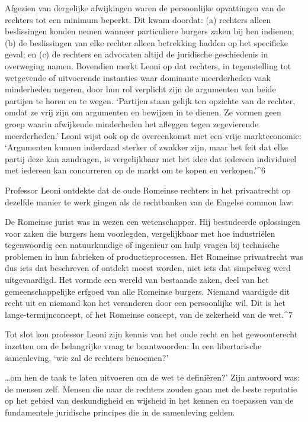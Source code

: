 \documentclass[
  a5paper,
  smalldemyvopaper,10pt,twoside,onecolumn,openright,extrafontsizes,hidelinks]{memoir}
\renewenvironment{quote}%
               {\list{}{\rightmargin=.6cm\leftmargin=.6cm}%
                \itshape \item[]}%
               {\endlist}
\begin{document}
Afgezien van dergelijke afwijkingen waren de persoonlijke opvattingen
van de rechters tot een minimum beperkt. Dit kwam doordat: (a) rechters
alleen beslissingen konden nemen wanneer particuliere burgers zaken bij
hen indienen; (b) de beslissingen van elke rechter alleen betrekking
hadden op het specifieke geval; en (c) de rechters en advocaten altijd
de juridische geschiedenis in overweging namen. Bovendien merkt Leoni op
dat rechters, in tegenstelling tot wetgevende of uitvoerende instanties
waar dominante meerderheden vaak minderheden negeren, door hun rol
verplicht zijn de argumenten van beide partijen te horen en te wegen.
`Partijen staan gelijk ten opzichte van de rechter, omdat ze vrij zijn
om argumenten en bewijzen in te dienen. Ze vormen geen groep waarin
afwijkende minderheden het afleggen tegen zegevierende meerderheden.'
Leoni wijst ook op de overeenkomst met een vrije markteconomie:
`Argumenten kunnen inderdaad sterker of zwakker zijn, maar het feit dat
elke partij deze kan aandragen, is vergelijkbaar met het idee dat
iedereen individueel met iedereen kan concurreren op de markt om te
kopen en verkopen.'\^{}6

Professor Leoni ontdekte dat de oude Romeinse rechters in het
privaatrecht op dezelfde manier te werk gingen als de rechtbanken van de
Engelse common law:

\begin{quote}
De Romeinse jurist was in wezen een wetenschapper. Hij bestudeerde
oplossingen voor zaken die burgers hem voorlegden, vergelijkbaar met hoe
industriëlen tegenwoordig een natuurkundige of ingenieur om hulp vragen
bij technische problemen in hun fabrieken of productieprocessen. Het
Romeinse privaatrecht was dus iets dat beschreven of ontdekt moest
worden, niet iets dat simpelweg werd uitgevaardigd. Het vormde een
wereld van bestaande zaken, deel van het gemeenschappelijke erfgoed van
alle Romeinse burgers. Niemand vaardigde dit recht uit en niemand kon
het veranderen door een persoonlijke wil. Dit is het
lange-termijnconcept, of het Romeinse concept, van de zekerheid van de
wet.\^{}7
\end{quote}

Tot slot kon professor Leoni zijn kennis van het oude recht en het
gewoonterecht inzetten om de belangrijke vraag te beantwoorden: In een
libertarische samenleving, `wie zal de rechters benoemen?'

\ldots om hen de taak te laten uitvoeren om de wet te definiëren?' Zijn
antwoord was: de mensen zelf. Mensen die naar de rechters zouden gaan
met de beste reputatie op het gebied van deskundigheid en wijsheid in
het kennen en toepassen van de fundamentele juridische principes die in
de samenleving gelden.
\end{document}
